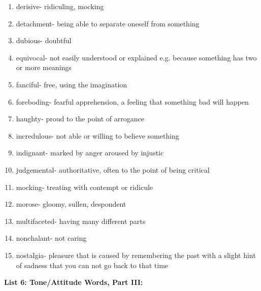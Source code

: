 \begin{enumerate}

\item derisive- ridiculing, mocking

\item detachment- being able to separate oneself from something

\item dubious- doubtful

\item equivocal- not easily understood or explained e.g. because something has two or more meanings

\item fanciful- free, using the imagination

\item foreboding- fearful apprehension, a feeling that something bad will happen

\item haughty- proud to the point of arrogance

\item incredulous- not able or willing to believe something

\item indignant- marked by anger aroused by injustic

\item judgemental- authoritative, often to the point of being critical

\item mocking- treating with contempt or ridicule

\item morose- gloomy, sullen, despondent

\item multifaceted- having many different parts

\item nonchalant- not caring

\item nostalgia-  pleasure that is caused by remembering the past with a slight hint of sadness that you can not go back to that time

\end{enumerate}

\textbf{List 6: Tone/Attitude Words, Part III:}

